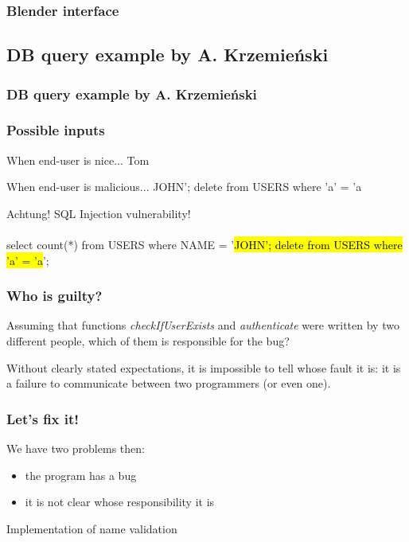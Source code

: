 \documentclass{beamer}
\begin{document}
\begin{frame}[fragile]
\frametitle{Blender interface}

\end{frame}


\subsection{DB query example by A. Krzemieński}
\begin{frame}[fragile]
\frametitle{DB query example by A. Krzemieński}

\end{frame}

\begin{frame}
\frametitle{Possible inputs}
\begin{block}{When end-user is nice...}
Tom
\end{block}

\pause
\begin{block}{When end-user is malicious...}
JOHN'; delete from USERS where 'a' = 'a
\end{block}

\pause
\begin{alertblock}{Achtung!}
SQL Injection vulnerability! \\~\\
select count(*) from USERS where NAME = '\hl{JOHN'; delete from USERS where 'a' = 'a}';
\end{alertblock}
\end{frame}

\begin{frame}
\frametitle{Who is guilty?}

\begin{block}{}
\small{Assuming that functions \textit{checkIfUserExists} and \textit{authenticate} were written by two different people, which of them is responsible for the bug?}
\end{block}
\pause
\begin{block}{}
\small{Without clearly stated expectations, it is impossible to tell whose fault it is: it is a failure to communicate between two programmers (or even one).}
\end{block}
\end{frame}

\begin{frame}
\frametitle{Let's fix it!}
We have two problems then:
\begin{itemize}
  \item the program has a bug
  \item it is not clear whose responsibility it is
\end{itemize}
\pause
\begin{block}{Implementation of name validation}

\end{block}
\end{frame}
\end{document}
